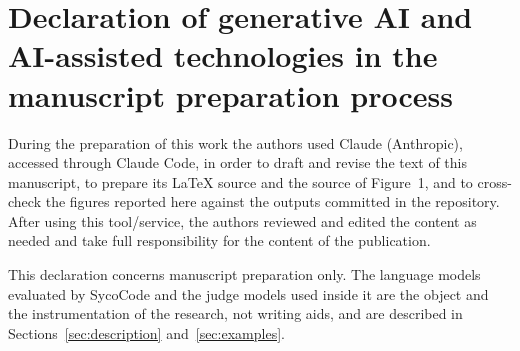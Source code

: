 \documentclass[preprint,12pt, a4paper]{elsarticle}
\begin{document}
\section*{Declaration of generative AI and AI-assisted technologies in the
manuscript preparation process}

During the preparation of this work the authors used Claude (Anthropic),
accessed through Claude Code, in order to draft and revise the text of this
manuscript, to prepare its \LaTeX{} source and the source of Figure~1, and to
cross-check the figures reported here against the outputs committed in the
repository. After using this tool/service, the authors reviewed and edited
the content as needed and take full responsibility for the content of the
publication.

This declaration concerns manuscript preparation only. The language models
evaluated by SycoCode and the judge models used inside it are the object and
the instrumentation of the research, not writing aids, and are described in
Sections~\ref{sec:description} and~\ref{sec:examples}.




\end{document}
